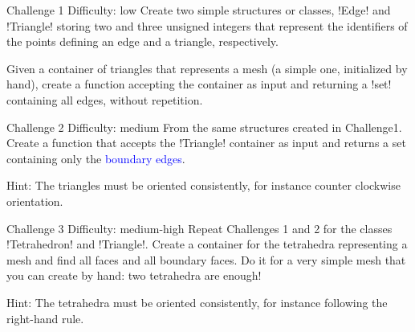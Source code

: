 \documentclass{beamer}
\begin{document}
\begin{frame}{Challenge 1}
\alert{Difficulty: low}
Create two simple structures or classes, \li!Edge! and \li!Triangle! 
storing two  and three unsigned integers that represent the identifiers of the points
defining an edge and a triangle, respectively. 

Given a container of triangles that represents a mesh (a simple one, initialized by hand), create a function
accepting the container as input and returning a \li!set! containing all edges, without repetition.

\end{frame}

\begin{frame}{Challenge 2}
\alert{Difficulty: medium}
From the same structures created in Challenge1. Create a function
that accepts the \li!Triangle! container as input and returns a set containing only the \textcolor{blue}{boundary edges}.
\smallskip

\alert{Hint:} The triangles must be oriented consistently, for instance counter clockwise orientation.
\end{frame}

\begin{frame}{Challenge 3}
  \alert{Difficulty: medium-high} Repeat Challenges 1 and 2 for
  the classes \li!Tetrahedron! and \li!Triangle!. Create a container for the
  tetrahedra representing a mesh and find all faces and all boundary
  faces.  Do it for a very simple mesh that you can create by hand:
  two tetrahedra are enough!  
\smallskip

  \alert{Hint:} The tetrahedra must be oriented consistently, for
  instance following the right-hand rule.
\end{frame}
\end{document}
